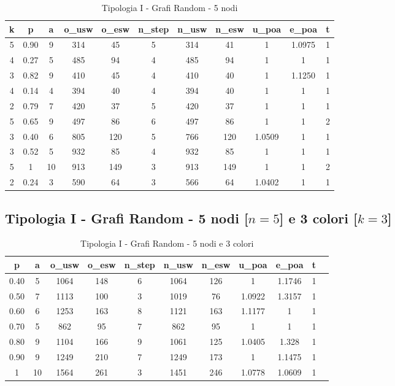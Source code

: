 \begin{table}[H]
\centering
\scalebox{0.9} {
\begin{tabular}{|c|c|c|c|c|c|c|c|c|c|c|}
\hline
\textbf{k} & \textbf{p} & \textbf{a} & \textbf{o\_usw} & \textbf{o\_esw} & \textbf{n\_step} & \textbf{n\_usw} & \textbf{n\_esw} & \textbf{u\_poa} & \textbf{e\_poa} & \textbf{t} \\ \hline
5 & 0.90 & 9 & 314 & 45 & 5 & 314 & 41 & 1 & 1.0975 & 1 \\ \hline
4 & 0.27 & 5 & 485 & 94 & 4 & 485 & 94 & 1 & 1 & 1 \\ \hline
3 & 0.82 & 9 & 410 & 45 & 4 & 410 & 40 & 1 & 1.1250 & 1 \\ \hline
4 & 0.14 & 4 & 394 & 40 & 4 & 394 & 40 & 1 & 1 & 1 \\ \hline
2 & 0.79 & 7 & 420 & 37 & 5 & 420 & 37 & 1 & 1 & 1 \\ \hline
5 & 0.65 & 9 & 497 & 86 & 6 & 497 & 86 & 1 & 1 & 2 \\ \hline
3 & 0.40 & 6 & 805 & 120 & 5 & 766 & 120 & 1.0509 & 1 & 1 \\ \hline
3 & 0.52 & 5 & 932 & 85 & 4 & 932 & 85 & 1 & 1 & 1 \\ \hline
5 & 1 & 10 & 913 & 149 & 3 & 913 & 149 & 1 & 1 & 2 \\ \hline
2 & 0.24 & 3 & 590 & 64 & 3 & 566 & 64 & 1.0402 & 1 & 1 \\ \hline
\end{tabular}
}
\caption{Tipologia I - Grafi Random - 5 nodi}
\label{tab:sperimentazione-tipo1-5nodi}
\end{table}

\subsection{Tipologia I - Grafi Random - 5 nodi [$n=5$] e 3 colori [$k=3$]}

\begin{table}[H]
\centering
\scalebox{0.9} {
\begin{tabular}{|c|c|c|c|c|c|c|c|c|c|c|}
\hline
\textbf{p} & \textbf{a} & \textbf{o\_usw} & \textbf{o\_esw} & \textbf{n\_step} & \textbf{n\_usw} & \textbf{n\_esw} & \textbf{u\_poa} & \textbf{e\_poa} & \textbf{t} \\ \hline
0.40 & 5 & 1064 & 148 & 6 & 1064 & 126 & 1 & 1.1746 & 1 \\ \hline
0.50 & 7 & 1113 & 100 & 3 & 1019 & 76 & 1.0922 & 1.3157 & 1 \\ \hline
0.60 & 6 & 1253 & 163 & 8 & 1121 & 163 & 1.1177 & 1 & 1 \\ \hline
0.70 & 5 & 862 & 95 & 7 & 862 & 95 & 1 & 1 & 1 \\ \hline
0.80 & 9 & 1104 & 166 & 9 & 1061 & 125 & 1.0405 & 1.328 & 1 \\ \hline
0.90 & 9 & 1249 & 210 & 7 & 1249 & 173 & 1 & 1.1475 & 1 \\ \hline
1 & 10 & 1564 & 261 & 3 & 1451 & 246 & 1.0778 & 1.0609 & 1 \\ \hline
\end{tabular}
}
\caption{Tipologia I - Grafi Random - 5 nodi e 3 colori}
\label{tab:sperimentazione-tipo1-5nodi3colori}
\end{table}

